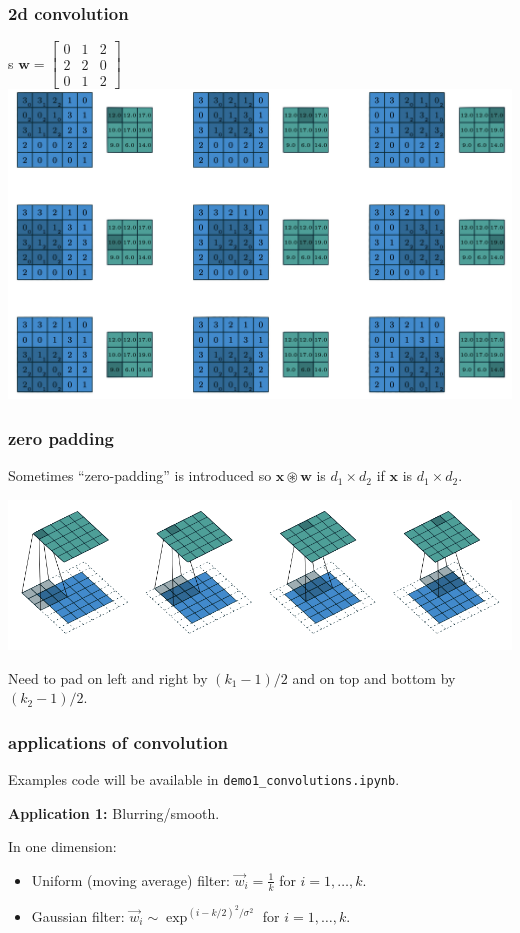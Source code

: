 \documentclass[handout,compress]{beamer}
\newcommand{\bv}[1]{\mathbf{#1}}
\begin{document}
	\begin{frame}
	\frametitle{2d convolution}s
	\small\centering
	$\bv{w} = \begin{bmatrix}0&1&2\\2&2&0\\0&1&2\end{bmatrix}$ \includegraphics[width=.9\textwidth]{standard2d.png}
	\end{frame}

	\begin{frame}
	\frametitle{zero padding}
	Sometimes ``zero-padding'' is introduced so $\bv{x}\circledast \bv{w}$ is $d_1\times d_2$ if $\bv{x}$ is $d_1\times d_2$.
	
	\includegraphics[width=.8\textwidth]{better_zero_pad.png} 
	
	Need to pad on left and right by $(k_1-1)/2$ and on top and bottom by $(k_2 - 1)/2$. 
	\end{frame}

	\begin{frame}
	\frametitle{applications of convolution}
		\begin{center}
			Examples code will be available in \texttt{demo1\_convolutions.ipynb}.
		\end{center}
		\textbf{Application 1:} Blurring/smooth.
		
		In one dimension:
		\begin{itemize}
			\item Uniform (moving average) filter: $\vec{w}_i = \frac{1}{k}$ for $i = 1,\ldots, k$.
			\item Gaussian filter: $\vec{w}_i \sim \exp^{(i-k/2)^2/\sigma^2}$ for $i = 1,\ldots, k$.
		\end{itemize}
	\end{frame}
\end{document}
